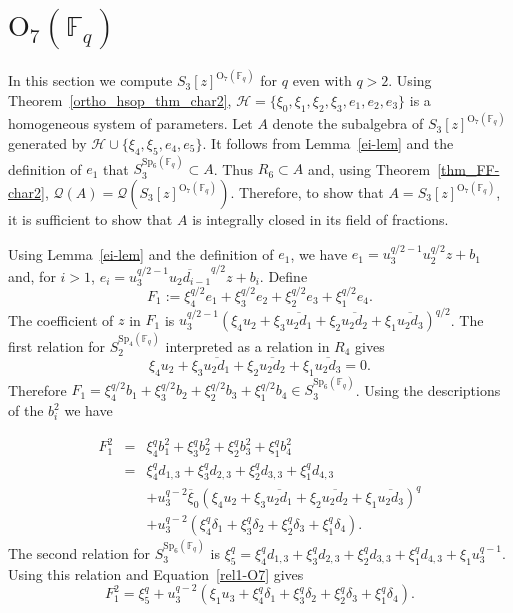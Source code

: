 \documentclass{amsart}
\newcommand{\field}{\mathbb{F}}
\newcommand{\syp}[2]{{{\text{Sp}_{{#1}}(\field_{#2})}}}
\newcommand{\orth}[2]{{{\text{O}_{{#1}}(\field_{#2})}}}
\newcommand{\FF}{\mathcal{Q}}
\renewcommand{\H}{\mathcal{H}}
\begin{document}
\section{\texorpdfstring{$\orth{7}{q}$}{Dimension 7}}\label{sec: dim7}
\label{dim7}

In this section we compute $S_3[z]^{\orth{7}{q}}$ for $q$ even with $q>2$.
Using Theorem~\ref{ortho_hsop_thm_char2}, $\H=\{\xi_0,\xi_1,\xi_2,\xi_3,e_1,e_2,e_3\}$ is a homogeneous system of parameters. 
Let $A$ denote the subalgebra of $S_3[z]^{\orth{7}{q}}$ generated by $\H\cup\{\xi_4,\xi_5,e_4,e_5\}$.
It follows from Lemma~\ref{ei-lem} and the definition of $e_1$ that $S_3^{\syp{6}{q}}\subset A$.
Thus $R_6\subset A$ and, using Theorem~\ref{thm_FF-char2}, $\FF(A)=\FF(S_3[z]^{\orth{7}{q}})$.
Therefore, to show that $A=S_3[z]^{\orth{7}{q}}$, it is sufficient to show that $A$ is integrally closed in its field of fractions.

Using Lemma~\ref{ei-lem} and the definition of $e_1$, we have 
$e_1=u_3^{q/2-1}u_2^{q/2}z+b_1$ and, for $i>1$,
$e_i=u_3^{q/2-1}\overline{u_2d_{i-1}}^{q/2}z+b_i$.
Define $$F_1:=\xi_4^{q/2}e_1+\xi_3^{q/2}e_2+\xi_2^{q/2}e_3+\xi_1^{q/2}e_4.$$
The coefficient of $z$ in $F_1$ is 
$u_3^{q/2-1}(\xi_4u_2+\xi_3\overline{u_2d_1}+\xi_2\overline{u_2d_2}+\xi_1\overline{u_2d_3})^{q/2}$.
The first relation for $S_2^{\syp{4}{q}}$ interpreted as a relation in $R_4$ gives
\begin{equation}\label{rel1-O7}
 \xi_4u_2+\xi_3\overline{u_2d_1}+\xi_2\overline{u_2d_2}+\xi_1\overline{u_2d_3}=0.
 \end{equation}
Therefore $F_1=\xi_4^{q/2}b_1+\xi_3^{q/2}b_2+\xi_2^{q/2}b_3+\xi_1^{q/2}b_4\in S_3^{\syp{6}{q}}$.
Using  the descriptions of the $b_i^2$ we have

\begin{eqnarray*}
F_1^2&=&\xi_4^q b_1^2+\xi_3^q b_2^2+\xi_2^q b_3^2+\xi_1^q b_4^2\\
&=&\xi_4^q d_{1,3} +\xi_3^q d_{2,3}+\xi_2^q d_{3,3}+\xi_1^q d_{4,3}\\
&&+ u_3^{q-2}\overline{\xi}_0(\xi_4u_2+\xi_3\overline{u_2d_1}+\xi_2\overline{u_2d_2}+\xi_1\overline{u_2d_3})^q\\
&&+u_3^{q-2}(\xi_4^q \delta_1+\xi_3^q \delta_2+\xi_2^q \delta_3+\xi_1^q \delta_4).
\end{eqnarray*}
The second relation for $S_3^{\syp{6}{q}}$ is $\xi_5^q=\xi_4^q d_{1,3} +\xi_3^q d_{2,3}+\xi_2^q d_{3,3}+\xi_1^q d_{4,3}+\xi_1 u_3^{q-1}$.
Using this relation and Equation~\ref{rel1-O7} gives
$$F_1^2=\xi_5^q +u_3^{q-2}(\xi_1 u_3+\xi_4^q \delta_1+\xi_3^q \delta_2+\xi_2^q \delta_3+\xi_1^q \delta_4).$$
\end{document}
